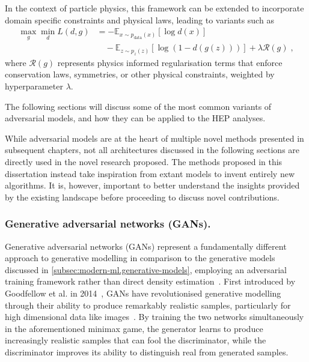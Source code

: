         In the context of particle physics, this framework can be extended to incorporate domain specific constraints and physical laws, leading to variants such as
        \begin{equation}
            \begin{split}
                \max_g \min_d L(d, g) &= -\mathbb{E}_{x \sim p_{\text{data}}(x)}[\log d(x)] \\
                &\quad - \mathbb{E}_{z \sim p_z(z)}[\log(1 - d(g(z)))] + \lambda \mathcal{R}(g)\;,
            \end{split}
        \end{equation}
        where \(\mathcal{R}(g)\) represents physics informed regularisation terms that enforce conservation laws, symmetries, or other physical constraints, weighted by hyperparameter \(\lambda\).

        The following sections will discuss some of the most common variants of adversarial models, and how they can be applied to the HEP analyses.
        
        \begin{note*}
        While adversarial models are at the heart of multiple novel methods presented in subsequent chapters, not all architectures discussed in the following sections are directly used in the novel research proposed.
        The methods proposed in this dissertation instead take inspiration from extant models to invent entirely new algorithms.
        It is, however, important to better understand the insights provided by the existing landscape before proceeding to discuss novel contributions. 
        \end{note*}
    
    \subsubsection{Generative adversarial networks (GANs).}
    \label{subsubsec:GANs}
        Generative adversarial networks (GANs) represent a fundamentally different approach to generative modelling in comparison to the generative models discussed in \cref{subsec:modern-ml.generative-models}, employing an adversarial training framework rather than direct density estimation~\cite{UCLDeepMind}.
        First introduced by Goodfellow et al. in 2014~\cite{Goodfellow2014GenerativeNetworks}, GANs have revolutionised generative modelling through their ability to produce remarkably realistic samples, particularly for high dimensional data like images~\cite{brock_large_2019, karras_analyzing_2020, karras_progressive_2018, zhang_self-attention_2019, karras_style-based_2019, denton_deep_2015}.
        By training the two networks simultaneously in the aforementioned minimax game, the generator learns to produce increasingly realistic samples that can fool the discriminator, while the discriminator improves its ability to distinguish real from generated samples.
    
